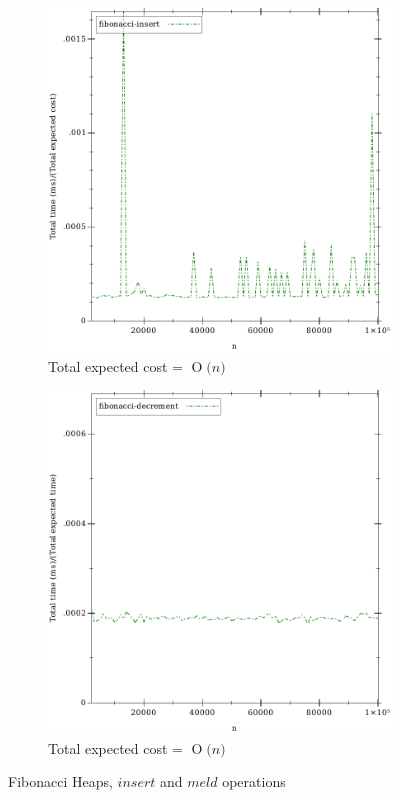 \documentclass{llncs}
\newcommand{\BigO}[1]{\ensuremath{\operatorname{O}\bigl(#1\bigr)}}
\begin{document}
\begin{figure}
	\begin{subfigure}{0.5\textwidth}
		\centering
		\includegraphics[width=0.8\linewidth]{FIG/fi_insert.pdf}
		\caption{Total expected cost = \BigO{n}}
		\label{fig:fi_insert}
	\end{subfigure}%
	\begin{subfigure}{0.5\textwidth}
		\centering
		\includegraphics[width=0.8\linewidth]{FIG/fi_decrement.pdf}
		\caption{Total expected cost = \BigO{n}}
		\label{fig:fi_meld}
	\end{subfigure}
	\caption{Fibonacci Heaps, $insert$ and $meld$ operations}
	\label{fig:fi_insert_meld}
\end{figure}
\end{document}
